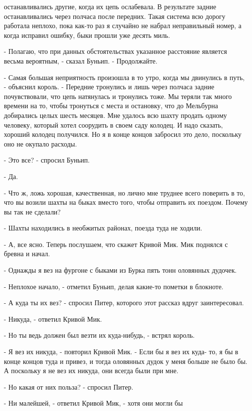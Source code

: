 останавливались другие, когда их цепь ослабевала. В результате задние 
останавливались через полчаса после передних. Такая система всю дорогу 
работала неплохо, пока как-то раз я случайно не набрал неправильный 
номер, а когда исправил ошибку, быки прошли уже десять миль.
\par- Полагаю, что при данных обстоятельствах указанное расстояние 
является весьма вероятным, - сказал Буньип. - Продолжайте.
\par- Самая большая неприятность произошла в то утро, когда мы 
двинулись в путь, - объяснил король. - Передние тронулись и лишь через 
полчаса задние почувствовали, что цепь натянулась и тронулись тоже. Мы 
теряли так много времени на то, чтобы тронуться с места и остановку, 
что до Мельбурна добирались целых шесть месяцев. Мне удалось всю шахту 
продать одному человеку, который хотел соорудить в своем саду колодец. 
И надо сказать, хороший колодец получился. Но я в конце концов 
забросил это дело, поскольку оно не окупало расходы.
\par- Это все? - спросил Буньип.
\par- Да.
\par- Что ж, ложь хорошая, качественная, но лично мне труднее всего 
поверить в то, что вы возили шахты на быках вместо того, чтобы 
отправить их поездом. Почему вы так не сделали?
\par- Шахты находились в необжитых районах, поезда туда не ходили.
\par- А, все ясно. Теперь послушаем, что скажет Кривой Мик.
 Мик поднялся с бревна и начал.
\par- Однажды я вез на фургоне с быками из Бурка пять тонн оловянных 
дудочек.
\par- Неплохое начало, - отметил Буньип, делая какие-то пометки в 
блокноте.
\par- А куда ты их вез? - спросил Питер, которого этот рассказ вдруг 
заинтересовал.
\par- Никуда, - ответил Кривой Мик.
\par- Но ты ведь должен был везти их куда-нибудь, - встрял король.
\par- Я вез их никуда, - повторил Кривой Мик. - Если бы я вез их куда-
то, я бы в конце концов туда и привез, и тогда оловянных дудок у меня 
больше не было бы. А поскольку я не вез их никуда, они всегда были при 
мне.
\par- Но какая от них польза? - спросил Питер.
\par- Ни малейшей, - ответил Кривой Мик, - хотя они могли бы 
